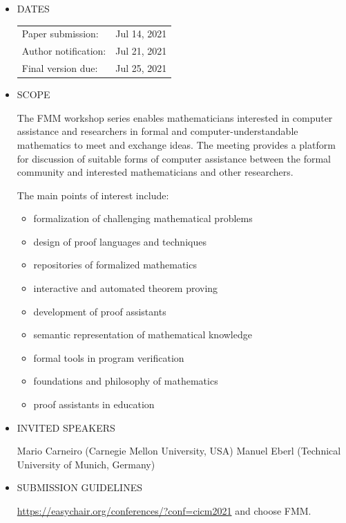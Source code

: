 \documentclass[prodmode,acmtecs]{acmsmall} %
\begin{document}
\begin{itemize}\item  DATES 
 
\begin{tabulary}{\linewidth}{LL}Paper submission:  & Jul 14, 2021 \\
Author notification:  & Jul 21, 2021 \\
Final version due:  & Jul 25, 2021 \\
\end{tabulary}
 
\item  SCOPE 
 
  The FMM workshop series enables mathematicians interested in computer assistance and researchers in formal and computer-understandable mathematics to meet and exchange ideas. The meeting provides a platform for discussion of suitable forms of computer assistance between the formal community and interested mathematicians and other researchers. 
 
  The main points of interest include:  
 
\begin{itemize}\item  formalization of challenging mathematical problems   
\item  design of proof languages and techniques   
\item  repositories of formalized mathematics   
\item  interactive and automated theorem proving   
\item  development of proof assistants   
\item  semantic representation of mathematical knowledge   
\item  formal tools in program verification   
\item  foundations and philosophy of mathematics   
\item  proof assistants in education 
\end{itemize} 
\item  INVITED SPEAKERS  
 
  Mario Carneiro (Carnegie Mellon University, USA) Manuel Eberl (Technical University of Munich, Germany)  
 
\item  SUBMISSION GUIDELINES 
 
 \href{https://easychair.org/conferences/?conf=cicm2021}{https://easychair.org/conferences/?conf=cicm2021} and choose FMM.  
 

\end{itemize}
\end{document}
